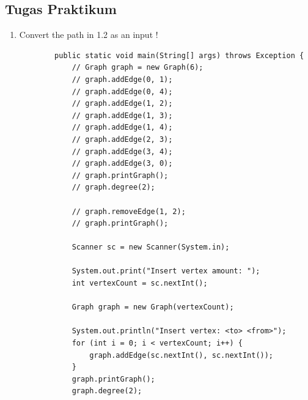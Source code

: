 \documentclass[12pt,titlepage]{article}
\begin{document}
\subsection{Tugas Praktikum}
\begin{enumerate}
    \item Convert the path in 1.2 as an input !
    \begin{verbatim}
        public static void main(String[] args) throws Exception {
            // Graph graph = new Graph(6);
            // graph.addEdge(0, 1);
            // graph.addEdge(0, 4);
            // graph.addEdge(1, 2);
            // graph.addEdge(1, 3);
            // graph.addEdge(1, 4);
            // graph.addEdge(2, 3);
            // graph.addEdge(3, 4);
            // graph.addEdge(3, 0);
            // graph.printGraph();
            // graph.degree(2);

            // graph.removeEdge(1, 2);
            // graph.printGraph();
            
            Scanner sc = new Scanner(System.in);
            
            System.out.print("Insert vertex amount: ");
            int vertexCount = sc.nextInt();
            
            Graph graph = new Graph(vertexCount);
            
            System.out.println("Insert vertex: <to> <from>");
            for (int i = 0; i < vertexCount; i++) {
                graph.addEdge(sc.nextInt(), sc.nextInt());
            }
            graph.printGraph();
            graph.degree(2);


\end{verbatim}
\end{enumerate}
\end{document}
